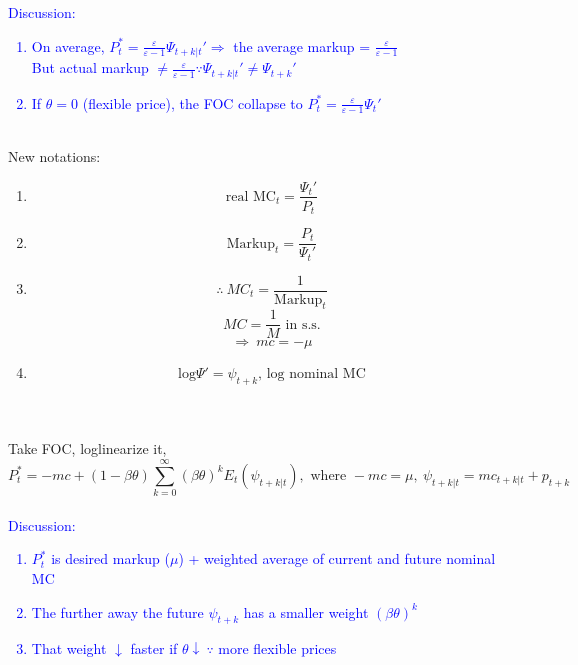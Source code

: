 \documentclass{article}
\begin{document}
\textcolor{blue}{Discussion:}
\textcolor{blue}{
\begin{enumerate}
    \item On average, $P_t^* = \frac{\varepsilon}{\varepsilon - 1}\Psi_{t+k|t}' \Rightarrow$ the average markup = $\frac{\varepsilon}{\varepsilon - 1}$\\
    But actual markup $\neq \frac{\varepsilon}{\varepsilon - 1} \because \Psi_{t+k|t}' \neq \Psi_{t+k}'$
    \item If $\theta = 0$ (flexible price), the FOC collapse to $P_t^* = \frac{\varepsilon}{\varepsilon - 1}\Psi_{t}'$\\
\end{enumerate}
}
\\
New notations:
\begin{enumerate}
    \item $$\text{real MC}_t = \frac{\Psi_t'}{P_t}$$
    \item $$\text{Markup}_t = \frac{P_t}{\Psi_t'}$$
    \item $$\therefore\ MC_t = \frac{1}{\text{Markup}_t}$$
    $$MC = \frac{1}{M} \text{ in s.s.}$$
    $$\Rightarrow\ mc = -\mu$$
    \item $$\text{log}\Psi' = \psi_{t+k}\text{, log nominal MC}$$\\
\end{enumerate}
\\
Take FOC, loglinearize it,
$$P_t^* = -mc + (1-\beta\theta)\sum_{k=0}^\infty (\beta\theta)^kE_t(\psi_{t+k|t}),\text{ where }-mc = \mu,\ \psi_{t+k|t} = mc_{t+k|t} + p_{t+k}$$
\\
\textcolor{blue}{Discussion:}
\textcolor{blue}{
\begin{enumerate}
    \item $P_t^*$ is desired markup ($\mu$) + weighted average of current and future nominal MC
    \item The further away the future $\psi_{t+k}$ has a smaller weight $(\beta\theta)^k$
    \item That weight $\downarrow$ faster if $\theta\downarrow\ \because$ more flexible prices
\end{enumerate}}
\end{document}
